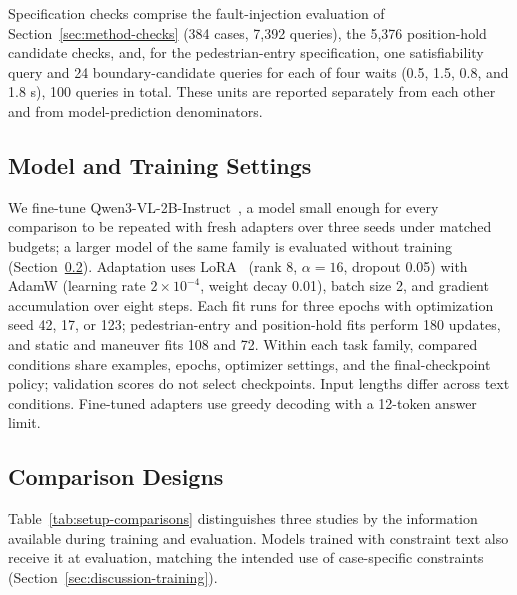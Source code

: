 Specification checks comprise the fault-injection evaluation of
Section~\ref{sec:method-checks} (384 cases, 7,392 queries), the 5,376
position-hold candidate checks, and, for the pedestrian-entry specification,
one satisfiability query and 24 boundary-candidate queries for each of four
waits (0.5, 1.5, 0.8, and 1.8 s), 100 queries in total. These units are
reported separately from each other and from model-prediction denominators.
\subsection{Model and Training Settings}\label{sec:setup-training}

We fine-tune Qwen3-VL-2B-Instruct~\cite{qwen2025qwen3vl2b}, a model small
enough for every comparison to be repeated with fresh adapters over three seeds
under matched budgets; a larger model of the same family is evaluated without
training (Section~\ref{sec:setup-comparisons}). Adaptation uses
LoRA~\cite{r14} (rank 8, $\alpha=16$, dropout 0.05) with AdamW (learning rate
$2\times10^{-4}$, weight decay 0.01), batch size 2, and gradient accumulation
over eight steps. Each fit runs for three epochs with optimization seed 42, 17,
or 123; pedestrian-entry and position-hold fits perform 180 updates, and static
and maneuver fits 108 and 72. Within each task family, compared conditions
share examples, epochs, optimizer settings, and the final-checkpoint policy;
validation scores do not select checkpoints. Input lengths differ across text
conditions. Fine-tuned adapters use greedy decoding with a 12-token answer
limit.

\subsection{Comparison Designs}\label{sec:setup-comparisons}

Table~\ref{tab:setup-comparisons} distinguishes three studies by the information
available during training and evaluation. Models trained with constraint text
also receive it at evaluation, matching the intended use of case-specific
constraints (Section~\ref{sec:discussion-training}).

